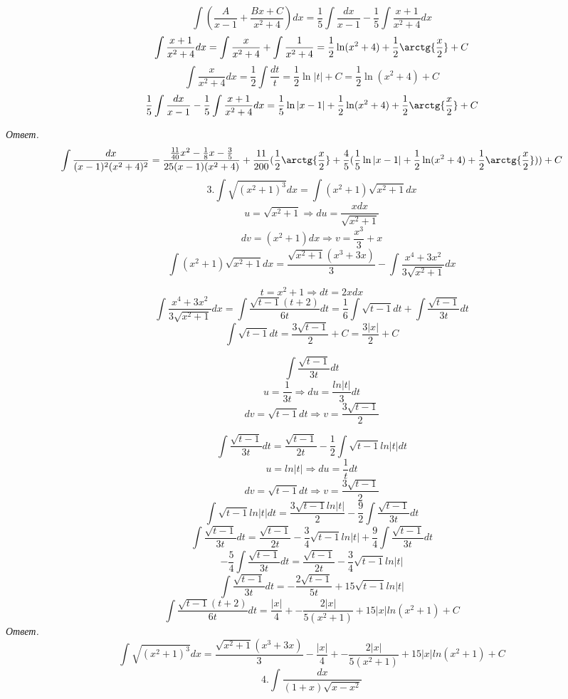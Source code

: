 \documentclass{article}
\begin{document}
	$$\int(\frac{A}{x - 1} + \frac{Bx + C}{x^2 + 4})dx = \frac{1}{5}\int\frac{dx}{x - 1} - \frac{1}{5}\int\frac{x + 1}{x^2 + 4}dx$$
	$$\int\frac{x + 1}{x^2 + 4}dx = \int\frac{x}{x^2+4} + \int\frac{1}{x^2 + 4} = \frac{1}{2}\ln(x^2 + 4) + \frac{1}{2}\arctg{\frac{x}{2}} + C$$
	$$\int\frac{x}{x^2 + 4}dx = \frac{1}{2}\int\frac{dt}{t} = \frac{1}{2}\ln|t| + C = \frac{1}{2}\ln(x^2 + 4) + C$$
	$$\frac{1}{5}\int\frac{dx}{x - 1} - \frac{1}{5}\int\frac{x + 1}{x^2 + 4}dx = \frac{1}{5}\ln|x - 1| + \frac{1}{2}\ln(x^2 + 4) + \frac{1}{2}\arctg{\frac{x}{2}} + C$$

	\emph{Ответ.} $$\int\frac{dx}{(x-1)^2(x^2+4)^2} = \frac{\frac{11}{40}x^2 - \frac{1}{8}x - \frac{3}{5}}{25(x-1)(x^2+4)} + \frac{11}{200}(\frac{1}{2}\arctg{\frac{x}{2}} + \frac{4}{5}(\frac{1}{5}\ln|x - 1| + \frac{1}{2}\ln(x^2 + 4) + \frac{1}{2}\arctg{\frac{x}{2}})) + C$$
	$$3. \int\sqrt{(x^2+1)^3}dx = \int(x^2 + 1)\sqrt{x^2 + 1}dx$$
	$$u = \sqrt{x^2 + 1} \Rightarrow du = \frac{xdx}{\sqrt{x^2 + 1}}$$
	$$dv = (x^2 + 1)dx \Rightarrow v = \frac{x^3}{3} + x$$
	$$\int(x^2 + 1)\sqrt{x^2 + 1}dx = \frac{\sqrt{x^2 + 1}(x^3 + 3x)}{3} - \int\frac{x^4 + 3x^2}{3\sqrt{x^2 + 1}}dx$$

	$$t = x^2 + 1 \Rightarrow dt = 2xdx$$
	$$\int\frac{x^4 + 3x^2}{3\sqrt{x^2 + 1}}dx = \int\frac{\sqrt{t - 1}(t + 2)}{6t}dt = \frac{1}{6}\int\sqrt{t - 1}dt + \int\frac{\sqrt{t - 1}}{3t}dt$$
	$$\int\sqrt{t - 1}dt = \frac{3\sqrt{t - 1}}{2} + C = \frac{3|x|}{2} + C$$

	$$\int\frac{\sqrt{t - 1}}{3t}dt$$
	$$u = \frac{1}{3t} \Rightarrow du = \frac{ln|t|}{3}dt$$
	$$dv = \sqrt{t - 1}dt \Rightarrow v = \frac{3\sqrt{t - 1}}{2}$$

	$$\int\frac{\sqrt{t - 1}}{3t}dt = \frac{\sqrt{t - 1}}{2t} - \frac{1}{2}\int\sqrt{t - 1}ln|t|dt$$
	$$u = ln|t| \Rightarrow du = \frac{1}{t}dt$$
	$$dv = \sqrt{t - 1}dt \Rightarrow v = \frac{3\sqrt{t - 1}}{2}$$
	$$\int\sqrt{t - 1}ln|t|dt = \frac{3\sqrt{t - 1}ln|t|}{2} - \frac{9}{2}\int\frac{\sqrt{t - 1}}{3t}dt$$
	$$\int\frac{\sqrt{t - 1}}{3t}dt = \frac{\sqrt{t - 1}}{2t} - \frac{3}{4}\sqrt{t - 1}ln|t| + \frac{9}{4}\int\frac{\sqrt{t - 1}}{3t}dt$$
	$$-\frac{5}{4}\int\frac{\sqrt{t - 1}}{3t}dt = \frac{\sqrt{t - 1}}{2t} - \frac{3}{4}\sqrt{t - 1}ln|t|$$
	$$\int\frac{\sqrt{t - 1}}{3t}dt = -\frac{2\sqrt{t - 1}}{5t} + 15\sqrt{t - 1}ln|t|$$
	$$\int\frac{\sqrt{t - 1}(t + 2)}{6t}dt = \frac{|x|}{4} + -\frac{2|x|}{5(x^2 + 1)} + 15|x|ln(x^2 + 1) + C$$
	\emph{Ответ.} $$\int\sqrt{(x^2+1)^3}dx = \frac{\sqrt{x^2 + 1}(x^3 + 3x)}{3} - \frac{|x|}{4} + -\frac{2|x|}{5(x^2 + 1)} + 15|x|ln(x^2 + 1) + C$$
	$$4. \int\frac{dx}{(1+x)\sqrt{x-x^2}}$$
\end{document}
